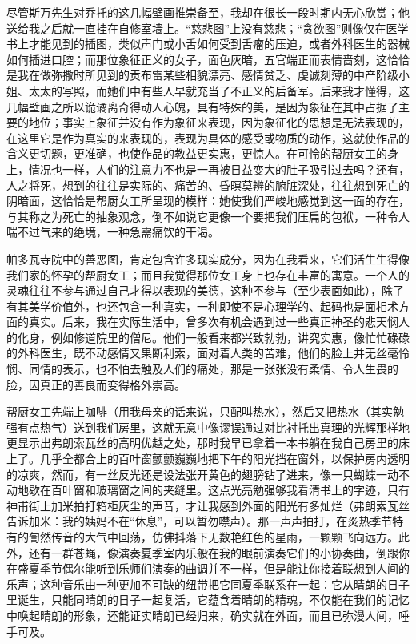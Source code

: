 \par 尽管斯万先生对乔托的这几幅壁画推崇备至，我却在很长一段时期内无心欣赏；他送给我之后就一直挂在自修室墙上。“慈悲图”上没有慈悲；“贪欲图”则像仅在医学书上才能见到的插图，类似声门或小舌如何受到舌瘤的压迫，或者外科医生的器械如何插进口腔；而那位象征正义的女子，面色灰暗，五官端正而表情啬刻，这恰恰是我在做弥撒时所见到的贡布雷某些相貌漂亮、感情贫乏、虔诚刻薄的中产阶级小姐、太太的写照，而她们中有些人早就充当了不正义的后备军。后来我才懂得，这几幅壁画之所以诡谲离奇得动人心魄，具有特殊的美，是因为象征在其中占据了主要的地位；事实上象征并没有作为象征来表现，因为象征化的思想是无法表现的，在这里它是作为真实的来表现的，表现为具体的感受或物质的动作，这就使作品的含义更切题，更准确，也使作品的教益更实惠，更惊人。在可怜的帮厨女工的身上，情况也一样，人们的注意力不也是一再被日益变大的肚子吸引过去吗？还有，人之将死，想到的往往是实际的、痛苦的、昏暝莫辨的腑脏深处，往往想到死亡的阴暗面，这恰恰是帮厨女工所呈现的模样：她使我们严峻地感觉到这一面的存在，与其称之为死亡的抽象观念，倒不如说它更像一个要把我们压扁的包袱，一种令人喘不过气来的绝境，一种急需痛饮的干渴。
\par 帕多瓦寺院中的善恶图，肯定包含许多现实成分，因为在我看来，它们活生生得像我们家的怀孕的帮厨女工；而且我觉得那位女工身上也存在丰富的寓意。一个人的灵魂往往不参与通过自己才得以表现的美德，这种不参与（至少表面如此），除了有其美学价值外，也还包含一种真实，一种即使不是心理学的、起码也是面相术方面的真实。后来，我在实际生活中，曾多次有机会遇到过一些真正神圣的悲天悯人的化身，例如修道院里的僧尼。他们一般看来都兴致勃勃，讲究实惠，像忙忙碌碌的外科医生，既不动感情又果断利索，面对着人类的苦难，他们的脸上并无丝毫怜悯、同情的表示，也不怕去触及人们的痛处，那是一张张没有柔情、令人生畏的脸，因真正的善良而变得格外崇高。
\par 帮厨女工先端上咖啡（用我母亲的话来说，只配叫热水），然后又把热水（其实勉强有点热气）送到我们房里，这就无意中像谬误通过对比衬托出真理的光辉那样地更显示出弗朗索瓦丝的高明优越之处，那时我早已拿着一本书躺在我自己房里的床上了。几乎全都合上的百叶窗颤颤巍巍地把下午的阳光挡在窗外，以保护房内透明的凉爽，然而，有一丝反光还是设法张开黄色的翅膀钻了进来，像一只蝴蝶一动不动地歇在百叶窗和玻璃窗之间的夹缝里。这点光亮勉强够我看清书上的字迹，只有神甫街上加米拍打箱柜灰尘的声音，才让我感到外面的阳光有多灿烂（弗朗索瓦丝告诉加米：我的姨妈不在“休息”，可以暂勿噤声）。那一声声拍打，在炎热季节特有的訇然传音的大气中回荡，仿佛抖落下无数艳红色的星雨，一颗颗飞向远方。此外，还有一群苍蝇，像演奏夏季室内乐般在我的眼前演奏它们的小协奏曲，倒跟你在盛夏季节偶尔能听到乐师们演奏的曲调并不一样，但是能让你接着联想到人间的乐声；这种音乐由一种更加不可缺的纽带把它同夏季联系在一起：它从晴朗的日子里诞生，只能同晴朗的日子一起复活，它蕴含着晴朗的精魂，不仅能在我们的记忆中唤起晴朗的形象，还能证实晴朗已经归来，确实就在外面，而且已弥漫人间，唾手可及。
